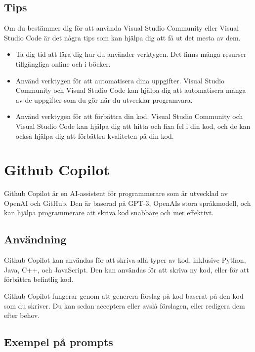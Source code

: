 \hypertarget{tips}{%
\subsection{Tips}\label{tips}}

Om du bestämmer dig för att använda Visual Studio Community eller Visual
Studio Code är det några tips som kan hjälpa dig att få ut det mesta av
dem.

\begin{itemize}
\tightlist
\item
  Ta dig tid att lära dig hur du använder verktygen. Det finns många
  resurser tillgängliga online och i böcker.
\item
  Använd verktygen för att automatisera dina uppgifter. Visual Studio
  Community och Visual Studio Code kan hjälpa dig att automatisera många
  av de uppgifter som du gör när du utvecklar programvara.
\item
  Använd verktygen för att förbättra din kod. Visual Studio Community
  och Visual Studio Code kan hjälpa dig att hitta och fixa fel i din
  kod, och de kan också hjälpa dig att förbättra kvaliteten på din kod.
\end{itemize}

\hypertarget{github-copilot}{%
\section{Github Copilot}\label{github-copilot}}

Github Copilot är en AI-assistent för programmerare som är utvecklad av
OpenAI och GitHub. Den är baserad på GPT-3, OpenAIs stora språkmodell,
och kan hjälpa programmerare att skriva kod snabbare och mer effektivt.

\hypertarget{anvuxe4ndning}{%
\subsection{Användning}\label{anvuxe4ndning}}

Github Copilot kan användas för att skriva alla typer av kod, inklusive
Python, Java, C++, och JavaScript. Den kan användas för att skriva ny
kod, eller för att förbättra befintlig kod.

Github Copilot fungerar genom att generera förslag på kod baserat på den
kod som du skriver. Du kan sedan acceptera eller avslå förslagen, eller
redigera dem efter behov.

\hypertarget{exempel-puxe5-prompts}{%
\subsection{Exempel på prompts}\label{exempel-puxe5-prompts}}

